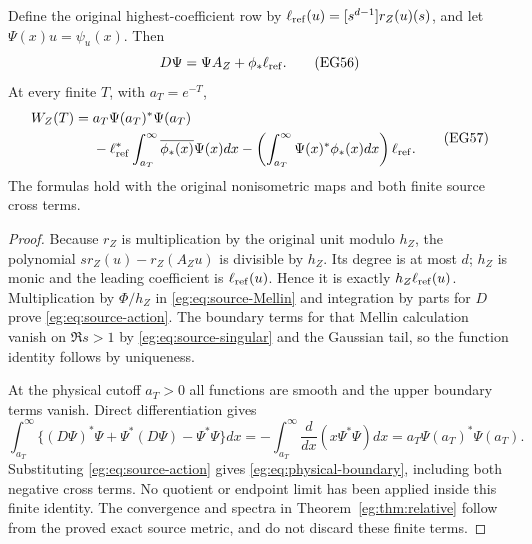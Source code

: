 \documentclass[11pt]{article}
\begin{document}
\begin{egtheorem}
\label{eg:thm:physical-boundary}
Define the original highest-coefficient row by
$\ell_{\rm ref}(u)=[s^{d-1}]r_Z(u)(s)$, and let
$\Psi(x)u=\psi_u(x)$. Then
\[
 D\Psi=\Psi A_Z+\phi_*\ell_{\rm ref}.
 \tag{EG56}\label{eg:eq:source-action}
\]
At every finite $T$, with $a_T=e^{-T}$,
\[
 \begin{split}
 W_Z(T)={}&a_T\Psi(a_T)^*\Psi(a_T)\\
 &-\ell_{\rm ref}^*\int_{a_T}^\infty\overline{\phi_*(x)}\Psi(x)dx
 -\left(\int_{a_T}^\infty\Psi(x)^*\phi_*(x)dx\right)\ell_{\rm ref}.
 \end{split}\tag{EG57}\label{eg:eq:physical-boundary}
\]
The formulas hold with the original nonisometric maps and both
finite source cross terms.
\end{egtheorem}
\begin{proof}
Because $r_Z$ is multiplication by the original unit modulo $h_Z$,
the polynomial $s r_Z(u)-r_Z(A_Zu)$ is divisible by $h_Z$.
Its degree is at most $d$; $h_Z$ is monic and the leading coefficient
is $\ell_{\rm ref}(u)$. Hence it is exactly
$h_Z\ell_{\rm ref}(u)$. Multiplication by $\Phi/h_Z$ in
\eqref{eg:eq:source-Mellin} and integration by parts for $D$ prove
\eqref{eg:eq:source-action}. The boundary terms for that Mellin
calculation vanish on $\Re s>1$ by \eqref{eg:eq:source-singular} and
the Gaussian tail, so the function identity follows by uniqueness.

At the physical cutoff $a_T>0$ all functions are smooth and the
upper boundary terms vanish. Direct differentiation gives
\[
 \int_{a_T}^\infty\{(D\Psi)^*\Psi+\Psi^*(D\Psi)-\Psi^*\Psi\}dx
 =-\int_{a_T}^\infty\frac{d}{dx}(x\Psi^*\Psi)dx
 =a_T\Psi(a_T)^*\Psi(a_T).
\]
Substituting \eqref{eg:eq:source-action} gives
\eqref{eg:eq:physical-boundary}, including both negative cross terms.
No quotient or endpoint limit has been applied inside this finite
identity. The convergence and spectra in
Theorem~\ref{eg:thm:relative} follow from the proved exact source metric,
and do not discard these finite terms.
\end{proof}
\end{document}
